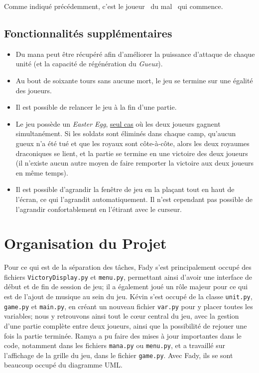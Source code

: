 \documentclass[11pt, a4paper, oneside, portrait]{article}
\begin{document}
            Comme indiqué précédemment, c'est le joueur \guillemotleft{}~du mal~\guillemotright{} qui commence.

            \subsection*{Fonctionnalités supplémentaires}
                \begin{itemize}
                    \item Du mana peut être récupéré afin d'améliorer la puissance d'attaque de chaque unité (et la capacité de régénération du \emph{Gueux}).
                    \item Au bout de soixante tours sans aucune mort, le jeu se termine sur une égalité des joueurs.
                    \item Il est possible de relancer le jeu à la fin d'une partie.
                    \item Le jeu possède un \emph{Easter Egg}, \underline{seul cas} où les deux joueurs gagnent simultanément.
                        Si les soldats sont éliminés dans chaque camp, qu'aucun gueux n'a été tué et que les royaux sont côte-à-côte, alors les deux royaumes draconiques se lient, et la partie se termine en une victoire des deux joueurs (il n'existe aucun autre moyen de faire remporter la victoire aux deux joueurs en même temps).
                    \item Il est possible d'agrandir la fenêtre de jeu en la plaçant tout en haut de l'écran, ce qui l'agrandit automatiquement. Il n'est cependant pas possible de l'agrandir confortablement en l'étirant avec le curseur.
                \end{itemize}

    \section*{Organisation du Projet}
        Pour ce qui est de la séparation des tâches, Fady s'est principalement occupé des fichiers \texttt{VictoryDisplay.py} et \texttt{menu.py}, permettant ainsi d'avoir une interface de début et de fin de session de jeu; il a également joué un rôle majeur pour ce qui est de l'ajout de musique au sein du jeu.
        Kévin s'est occupé de la classe \texttt{unit.py}, \texttt{game.py} et \texttt{main.py}, en créant un nouveau fichier \texttt{var.py} pour y placer toutes les variables; nous y retrouvons ainsi tout le c\oe{}ur central du jeu, avec la gestion d'une partie complète entre deux joueurs, ainsi que la possibilité de rejouer une fois la partie terminée.
        Ramya a pu faire des mises à jour importantes dans le code, notamment dans les fichiers \texttt{mana.py} ou \texttt{menu.py}, et a travaillé sur l'affichage de la grille du jeu, dans le fichier \texttt{game.py}.
        Avec Fady, ils se sont beaucoup occupé du diagramme UML.
\end{document}
